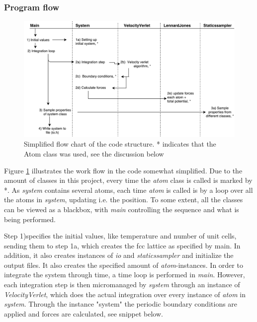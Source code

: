 \subsubsection{Program flow}

\begin{figure}[H]
	\centering
	\includegraphics[width=1\linewidth]{../figures/klasser_proj5}
	\caption{Simplified flow chart of the code structure. * indicates that the Atom class was used, see the discussion below}
	\label{fig:klasserproj5}
\end{figure}

Figure \ref{fig:klasserproj5} illustrates the work flow in the code somewhat simplified. Due to the amount of classes in this project, every time the \textit{atom} class is called is marked by *. As  \textit{system} contains several atoms, each time \textit{atom} is called is by a loop over all the atoms in \textit{system}, updating i.e. the position. To some extent, all the classes can be viewed as a blackbox, with \textit{main} controlling the sequence and what is being performed. 

Step 1)specifies the initial values, like temperature and number of unit cells, sending them to step 1a, which creates the fcc lattice as specified by main. In addition, it also creates instances of \textit{io} and \textit{staticssampler} and initialize  the output files.  It also creates the specified amount of \textit{atom}-instances. In order to integrate the system through time, a time loop is performed in \textit{main}. However, each integration step is then micromanaged by \textit{system} through an instance of \textit{VelocityVerlet}, which does the actual integration over every instance of \textit{atom} in \textit{system}. Through the instance "system" the periodic boundary conditions are applied and forces are calculated, see snippet below. 

